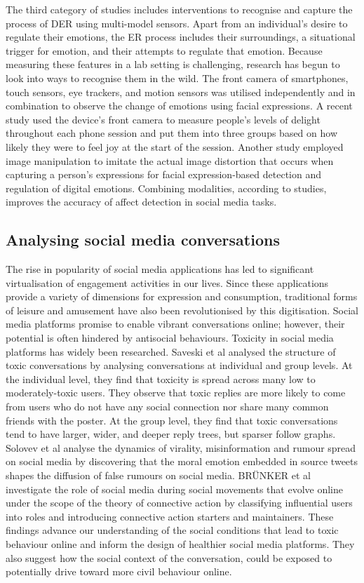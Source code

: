 \documentclass[acmtog]{acmart}
\begin{document}
The third category of studies includes interventions to recognise and capture the process of DER using multi-model sensors. Apart from an individual's desire to regulate their emotions, the ER process includes their surroundings, a situational trigger for emotion, and their attempts to regulate that emotion. Because measuring these features in a lab setting is challenging, research has begun to look into ways to recognise them in the wild. The front camera of smartphones, touch sensors, eye trackers, and motion sensors was utilised independently and in combination to observe the change of emotions using facial expressions. A recent study used the device's front camera to measure people's levels of delight throughout each phone session and put them into three groups based on how likely they were to feel joy at the start of the session. Another study employed image manipulation to imitate the actual image distortion that occurs when capturing a person's expressions for facial expression-based detection and regulation of digital emotions. Combining modalities, according to studies, improves the accuracy of affect detection in social media tasks.







\subsection{Analysing social media conversations}
The rise in popularity of social media applications has led to significant virtualisation of engagement activities in our lives. Since these applications provide a variety of dimensions for expression and consumption, traditional forms of leisure and amusement have also been revolutionised by this digitisation. Social media platforms promise to enable vibrant conversations online; however, their potential is often hindered by antisocial behaviours. Toxicity in social media platforms has widely been researched. Saveski et al analysed the structure of toxic conversations by analysing conversations at individual and group levels. At the individual level, they find that toxicity is spread across many low to moderately-toxic users. They observe that toxic replies are more likely to come from users who do not have any social connection nor share many common friends with the poster. At the group level, they find that toxic conversations tend to have larger, wider, and deeper reply trees, but sparser follow graphs. Solovev et al analyse the dynamics of virality, misinformation and rumour spread on social media by discovering that the moral emotion embedded in source tweets shapes the diffusion of false rumours on social media. BRÜNKER et al investigate the role of social media during social movements that evolve online under the scope of the theory of connective action by classifying influential users into roles and introducing connective action starters and maintainers. These findings advance our understanding of the social conditions that lead to toxic behaviour online and inform the design of healthier social media platforms. They also suggest how the social context of the conversation, could be exposed to potentially drive toward more civil behaviour online.
\end{document}
